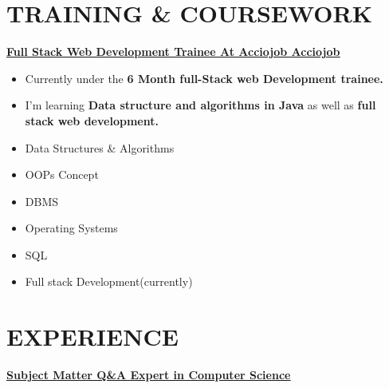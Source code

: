 \documentclass[letterpaper,11pt]{article}
\newcommand{\resumeItem}[1]{
  \item\small{
    {#1 \vspace{-2pt}}
  }
}
\newcommand{\resumeItemListStart}{\begin{itemize}}
\newcommand{\resumeItemListEnd}{\end{itemize}\vspace{-5pt}}
\begin{document}
\section{TRAINING \& COURSEWORK}
    {\href{certificate_link.com} {\textbf{\large{\underline{Full Stack Web Development Trainee At Acciojob  }} } } \hspace{170pt} {\href{https://acciojob.com/}{\textbf{\underline{Acciojob}}} \\  \vspace{3pt}} }

     \vspace{-0.7cm}
    \resumeItemListStart
        \resumeItem{\normalsize{Currently under the \textbf{6 Month full-Stack web Development trainee.} }}
        \resumeItem{\normalsize{I'm learning \textbf{Data structure and algorithms in Java } as well as \textbf{full stack web development.} }}
    \resumeItemListEnd
   
 

  \vspace{6pt}
        \begin{multicols}{3}
            \begin{itemize}[itemsep=-2pt, parsep=5pt]
                \item Data Structures \& Algorithms
                \item OOPs Concept
                \item DBMS
                \item Operating Systems  \item SQL
                \item Full stack Development(currently)
            \end{itemize}
        \end{multicols}
        \vspace*{2.0\multicolsep}

\vspace{-12pt}


\section{EXPERIENCE}
        \vspace{2pt}
    {\href{https://drive.google.com/file/d/1Xtc4px3jrPeePsLFCAPfNLwlI49aYOwA/view?usp=share_link} {\textbf{\large{\underline{Subject Matter Q\&A Expert in Computer Science  }}{\raisebox{-0.1\height}\faExternalLink} } }  }
\end{document}
